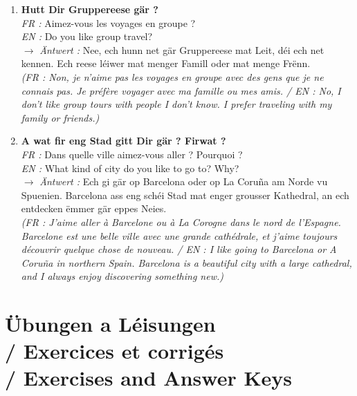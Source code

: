\begin{enumerate}
    \vspace{0.3em}

    \item \textbf{Hutt Dir Gruppereese gär ?} \\
    \textit{FR :} Aimez-vous les voyages en groupe ? \\
    \textit{EN :} Do you like group travel? \\
    $\rightarrow$ \textit{Äntwert :} Nee, ech hunn net gär Gruppereese mat Leit, déi ech net kennen. Ech reese léiwer mat menger Famill oder mat menge Frënn. \\
    \textit{\small(FR : Non, je n'aime pas les voyages en groupe avec des gens que je ne connais pas. Je préfère voyager avec ma famille ou mes amis. / EN : No, I don't like group tours with people I don't know. I prefer traveling with my family or friends.)}

    \vspace{0.3em}

    \item \textbf{A wat fir eng Stad gitt Dir gär ? Firwat ?} \\
    \textit{FR :} Dans quelle ville aimez-vous aller ? Pourquoi ? \\
    \textit{EN :} What kind of city do you like to go to? Why? \\
    $\rightarrow$ \textit{Äntwert :} Ech gi gär op Barcelona oder op La Coruña am Norde vu Spuenien. Barcelona ass eng schéi Stad mat enger grousser Kathedral, an ech entdecken ëmmer gär eppes Neies. \\
    \textit{\small(FR : J'aime aller à Barcelone ou à La Corogne dans le nord de l'Espagne. Barcelone est une belle ville avec une grande cathédrale, et j'aime toujours découvrir quelque chose de nouveau. / EN : I like going to Barcelona or A Coruña in northern Spain. Barcelona is a beautiful city with a large cathedral, and I always enjoy discovering something new.)}
\end{enumerate}

\vspace{1.5em}

\section[Übungen a Léisungen]{Übungen a Léisungen \\/ Exercices et corrigés \\/ Exercises and Answer Keys}

